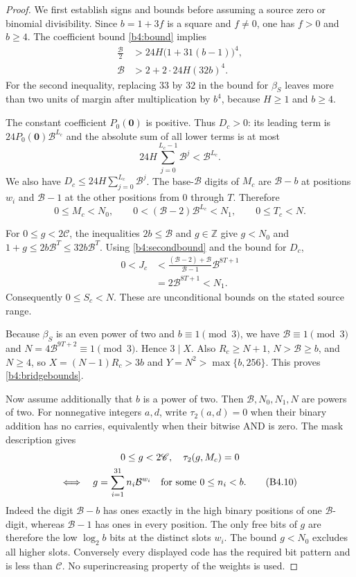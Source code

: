 \begin{proof}
We first establish signs and bounds before assuming a source zero or
binomial divisibility.  Since $b=1+3f$ is a square and $f\ne0$,
one has $f>0$ and $b\ge4$.  The coefficient bound
\eqref{b4:bound} implies
\begin{align}
 \frac{\mathcal B}{2}
 &>24H\bigl(1+31(b-1)\bigr)^4,
 \label{b4:firstbound}\\
 \mathcal B
 &>2+2\cdot24H(32b)^4.
 \label{b4:secondbound}
\end{align}
For the second inequality, replacing $33$ by $32$ in the bound for
$\beta_S$ leaves more than two units of margin after multiplication
by $b^4$, because $H\ge1$ and $b\ge4$.

The constant coefficient $P_0(\mathbf0)$ is positive.  Thus $D_c>0$:
its leading term is $24P_0(\mathbf0)\mathcal B^{L_c}$ and the
absolute sum of all lower terms is at most
\[
 24H\sum_{j=0}^{L_c-1}\mathcal B^j<\mathcal B^{L_c}.
\]
We also have
$D_c\le24H\sum_{j=0}^{L_c}\mathcal B^j$.
The base-$\mathcal B$ digits of $M_c$ are $\mathcal B-b$ at
positions $w_i$ and $\mathcal B-1$ at the other positions from
$0$ through $T$.  Therefore
\[
 0\le M_c<N_0,\qquad
 0<(\mathcal B-2)\mathcal B^{L_c}<N_1,\qquad
 0\le T_c<N.
 \tag{B4.9}\label{b4:blocksT}
\]

For $0\le g<2\mathscr C$, the inequalities
$2b\le\mathcal B$ and $g\in\mathbb Z$ give
$g<N_0$ and $1+g\le2b\mathcal B^T\le32b\mathcal B^T$.
Using \eqref{b4:secondbound} and the bound for $D_c$,
\begin{align*}
 0<J_c
 &<
 \frac{(\mathcal B-2)+\mathcal B}{\mathcal B-1}
       \mathcal B^{8T+1}\\
 &=2\mathcal B^{8T+1}<N_1.
\end{align*}
Consequently $0\le S_c<N$.  These are unconditional bounds on
the stated source range.

Because $\beta_S$ is an even power of two and $b\equiv1\pmod3$,
we have $\mathcal B\equiv1\pmod3$ and
$N=4\mathcal B^{9T+2}\equiv1\pmod3$.  Hence $3\mid X$.
Also $R_c\ge N+1$, $N>\mathcal B\ge b$, and $N\ge4$, so
$X=(N-1)R_c>3b$ and $Y=N^2>\max\{b,256\}$.
This proves \eqref{b4:bridgebounds}.

Now assume additionally that $b$ is a power of two.  Then
$\mathcal B,N_0,N_1,N$ are powers of two.  For nonnegative integers
$a,d$, write $\tau_2(a,d)=0$ when their binary addition has no
carries, equivalently when their bitwise AND is zero.  The mask
description gives
\begin{multline}
 0\le g<2\mathscr C,\quad \tau_2(g,M_c)=0\\
 \Longleftrightarrow\quad
 g=\sum_{i=1}^{31}n_i\mathcal B^{w_i}
 \quad\hbox{for some }0\le n_i<b.
 \tag{B4.10}\label{b4:mask}
\end{multline}
Indeed the digit $\mathcal B-b$ has ones exactly in the high binary
positions of one $\mathcal B$-digit, whereas $\mathcal B-1$ has
ones in every position.  The only free bits of $g$ are therefore
the low $\log_2b$ bits at the distinct slots $w_i$.  The bound
$g<N_0$ excludes all higher slots.  Conversely every displayed
code has the required bit pattern and is less than $\mathscr C$.
No superincreasing property of the weights is used.


\end{proof}
